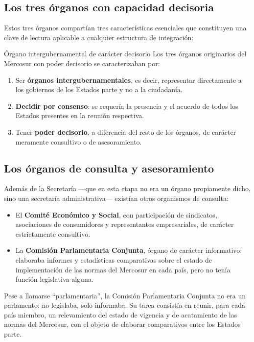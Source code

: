 \documentclass[12pt,oneside]{book}
\begin{document}
\subsection{Los tres órganos con capacidad decisoria}

Estos tres órganos compartían tres características esenciales que constituyen una clave de lectura aplicable a cualquier estructura de integración:

\begin{definition}{Órgano intergubernamental de carácter decisorio}
Los tres órganos originarios del Mercosur con poder decisorio se caracterizaban por:
\begin{enumerate}
    \item Ser \textbf{órganos intergubernamentales}, es decir, representar directamente a los gobiernos de los Estados parte y no a la ciudadanía.
    \item \textbf{Decidir por consenso}: se requería la presencia y el acuerdo de todos los Estados presentes en la reunión respectiva.
    \item Tener \textbf{poder decisorio}, a diferencia del resto de los órganos, de carácter meramente consultivo o de asesoramiento.
\end{enumerate}
\end{definition}

\subsection{Los órganos de consulta y asesoramiento}

Además de la Secretaría —que en esta etapa no era un órgano propiamente dicho, sino una secretaría administrativa— existían otros organismos de consulta:

\begin{itemize}
    \item El \textbf{Comité Económico y Social}, con participación de sindicatos, asociaciones de consumidores y representantes empresariales, de carácter estrictamente consultivo.
    \item La \textbf{Comisión Parlamentaria Conjunta}, órgano de carácter informativo: elaboraba informes y estadísticas comparativas sobre el estado de implementación de las normas del Mercosur en cada país, pero no tenía función legislativa alguna.
\end{itemize}

\begin{note}
Pese a llamarse ``parlamentaria'', la Comisión Parlamentaria Conjunta no era un parlamento: no legislaba, solo informaba. Su tarea consistía en reunir, para cada país miembro, un relevamiento del estado de vigencia y de acatamiento de las normas del Mercosur, con el objeto de elaborar comparativos entre los Estados parte.
\end{note}
\end{document}
